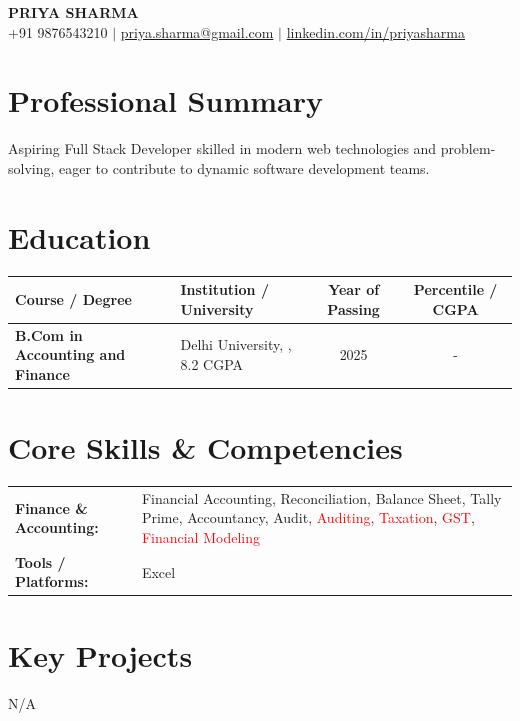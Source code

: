 \documentclass[10pt,a4paper]{article}
\begin{document}
\begin{center}
{\LARGE \textsc{\textbf{PRIYA SHARMA}}} \\ \vspace{3pt}
+91 9876543210 \quad $|$ \quad \href{mailto:priya.sharma@gmail.com}{priya.sharma@gmail.com} \quad $|$ \quad \href{https://linkedin.com/in/priyasharma}{linkedin.com/in/priyasharma}
\end{center}

\section*{Professional Summary}
Aspiring Full Stack Developer skilled in modern web technologies and problem-solving, eager to contribute to dynamic software development teams.

\section*{Education}
{\small
\renewcommand{\arraystretch}{1.18}
\noindent\begin{tabularx}{\textwidth}{|p{1.7in}|X|c|c|}
\hline
\textbf{Course / Degree} & \textbf{Institution / University} & \textbf{Year of Passing} & \textbf{Percentile / CGPA} \\ \hline
\textbf{B.Com in Accounting and Finance} & Delhi University, , 8.2 CGPA & 2025 & - \\ \hline
\end{tabularx}
}\vspace{4pt}


\section*{Core Skills \& Competencies}
\begin{tabular}{@{}p{2.3in}p{4.5in}@{}}
\textbf{Finance \& Accounting:} & Financial Accounting, Reconciliation, Balance Sheet, Tally Prime, Accountancy, Audit, \textcolor{red}{Auditing}, \textcolor{red}{Taxation}, \textcolor{red}{GST}, \textcolor{red}{Financial Modeling} \\
\textbf{Tools / Platforms:} & Excel \\
\end{tabular}



\section*{Key Projects}
N/A


\end{document}
